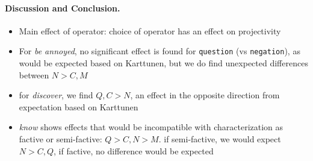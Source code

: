 \documentclass[12pt, a4paper]{scrartcl}
\begin{document}

\paragraph{Discussion and Conclusion.} %
	\begin{itemize}
		\item Main effect of operator: choice of operator has an effect on projectivity
		\item For \emph{be annoyed}, no significant effect is found for \texttt{question} (vs \texttt{negation}), as would be expected based on Karttunen, but we do find unexpected differences between $N > C, M$ 
		\item for \emph{discover}, we find $Q, C > N$, an effect in the opposite direction from expectation based on Karttunen
		\item \emph{know} shows effects that would be incompatible with characterization as factive or semi-factive: $Q > C, N > M$. if semi-factive, we would expect $N > C, Q$, if factive, no difference would be expected
	\end{itemize}

\pagebreak

\end{document}
